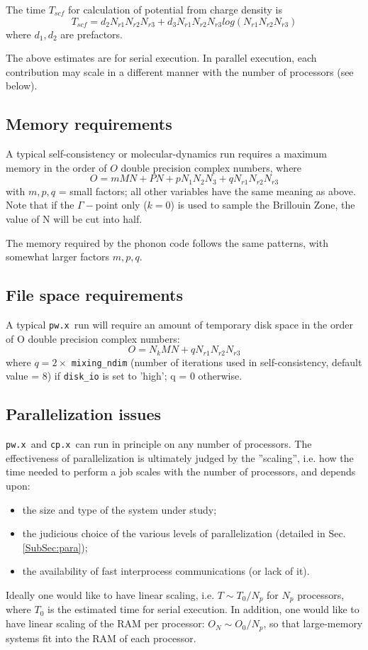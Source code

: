 \documentclass[12pt,a4paper]{article}
\def\pwx{\texttt{pw.x}}
\def\cpx{\texttt{cp.x}}
\begin{document}
The time $T_{scf}$ for calculation of potential from charge density is
$$T_{scf} = d_2 N_{r1} N_{r2} N_{r3} + d_3 N_{r1} N_{r2} N_{r3} 
            log(N_{r1} N_{r2} N_{r3} )$$
where $d_1, d_2$ are prefactors.

The above estimates are for serial execution. In parallel execution,
each contribution may scale in a different manner with the number of processors (see below).

\subsection{Memory requirements}

A typical self-consistency or molecular-dynamics run requires a maximum
memory in the order of $O$ double precision complex numbers, where
$$ O = m M N + P N + p N_1 N_2 N_3 + q N_{r1} N_{r2} N_{r3}$$
with $m, p, q$ = small factors; all other variables have the same meaning as
above. Note that if the $\Gamma-$point only ($k=0$) is used to sample the 
Brillouin Zone, the value of N will be cut into half.

The memory required by the phonon code follows the same patterns, with
somewhat larger factors $m, p, q$.

\subsection{File space requirements}

A typical \pwx\ run will require an amount of temporary disk space in the
order of O double precision complex numbers:
$$O = N_k M N + q N_{r1} N_{r2}N_{r3}$$
where $q = 2\times$ \texttt{mixing\_ndim} (number of iterations used in 
self-consistency, default value = 8) if \texttt{disk\_io} is set to 'high'; q = 0 
otherwise.

\subsection{Parallelization issues}
\label{SubSec:badpara}

\pwx\ and \cpx\ can run in principle on any number of processors.
The effectiveness of parallelization is ultimately judged by the 
''scaling'', i.e. how the time needed to perform a job scales
 with the number of processors, and depends upon:
\begin{itemize}
\item the size and type of the system under study;
\item the judicious choice of the various levels of parallelization 
(detailed in Sec.\ref{SubSec:para});
\item the availability of fast interprocess communications (or lack of it).
\end{itemize}
Ideally one would like to have linear scaling, i.e. $T \sim T_0/N_p$ for 
$N_p$ processors, where $T_0$ is the estimated time for serial execution.
 In addition, one would like to have linear scaling of
the RAM per processor: $O_N \sim O_0/N_p$, so that large-memory systems
fit into the RAM of each processor.
\end{document}

